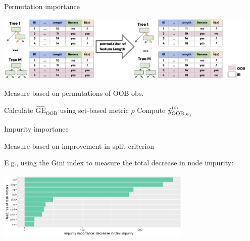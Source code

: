 \documentclass[11pt,compress,t,notes=noshow, xcolor=table]{beamer}
\begin{document}
\begin{vbframe}{Permutation importance}

\includegraphics[width = 0.95\textwidth]{figure_man/forest-permutation-imp.png}
\vspace{-2ex}
\begin{algorithm}[H]
\small
\caption*{Measure based on permutations of OOB obs.}
\begin{algorithmic}[1]
  \State Calculate $\widehat{\mathrm{GE}}_{\text{OOB}}$ using set-based metric $\rho$
		\State Compute {$\hat{y}^{(i)}_{\text{OOB},\psi_j}$}
	  \EndFor
  \EndFor
\end{algorithmic}
\end{algorithm}
\vspace{-3ex}
\end{vbframe}

\begin{vbframe}{Impurity importance}
\vspace{-2ex}
\begin{algorithm}[H]
\small
\caption*{Measure based on improvement in split criterion}
\begin{algorithmic}[1]
  \EndFor
  \EndFor
\end{algorithmic}
\end{algorithm}
\small
E.g., using the Gini index to measure the total decrease in node impurity:

\vspace{-1ex}

\begin{center}
\includegraphics[width=0.7\textwidth]{figure/forest-fimp_gini.png}
\end{center}

\end{vbframe}
\end{document}
